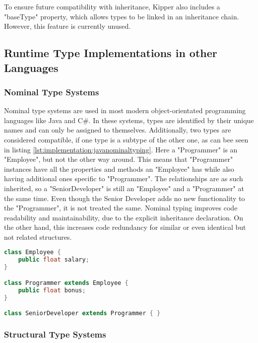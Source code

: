 To ensure future compatibility with inheritance, Kipper also includes a "baseType" property, which allows types to be linked in an inheritance chain. However, this feature is currently unused.

\subsection{Runtime Type Implementations in other Languages}
\label{chap:runtime-other-languages}

\subsubsection{Nominal Type Systems}

Nominal type systems are used in most modern object-orientated programming languages like Java and C\#. In these systems, types are identified by their unique names and can only be assigned to themselves. Additionally, two types are considered compatible, if one type is a subtype of the other one, as can bee seen in listing \ref{lst:implementation:javanominaltyping}. Here a "Programmer" is an "Employee", but not the other way around. This means that "Programmer" instances have all the properties and methods an "Employee" has while also having additional ones specific to "Programmer". The relationships are as such inherited, so a "SeniorDeveloper" is still an "Employee" and a "Programmer" at the same time. Even though the Senior Developer adds no new functionality to the "Programmer", it is not treated the same. Nominal typing improves code readability and maintainability, due to the explicit inheritance declaration. On the other hand, this increases code redundancy for similar or even identical but not related structures.

\begin{lstlisting}[language=Java,caption=Example of nominal typing in java,label=lst:implementation:javanominaltyping]
class Employee {
	public float salary;
}

class Programmer extends Employee {
	public float bonus;
}

class SeniorDeveloper extends Programmer { }
\end{lstlisting}

\subsubsection{Structural Type Systems}

